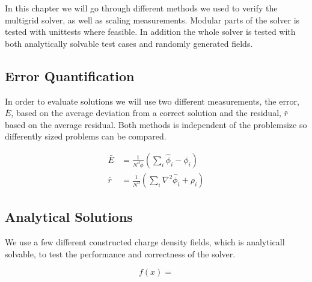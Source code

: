 In this chapter we will go through different methods we used to verify the multigrid
solver, as well as scaling measurements. Modular parts of the solver is tested with unittests
where feasible. In addition the whole solver is tested with both analytically solvable
test cases and randomly generated fields.

\subsection{Error Quantification}
	In order to evaluate solutions we will use two different measurements, the error, \(\bar{E}\), based
	on the average deviation from a correct solution and the residual, \(\bar{r}\) based on the average
	residual. Both methods is independent of the problemsize so differently sized problems can be compared.

	\begin{align}
		\bar{E} &= \frac{1}{N^d\bar{\phi}}\left( \sum_i{\hat{\phi}_i - \phi_i} \right)
		\\
		\bar{r} &= \frac{1}{N^d}\left( \sum_i{ \nabla^2 \hat{\phi}_i + \rho_i  }  \right)
	\end{align}

	\subsection{Analytical Solutions}
		We use a few different constructed charge density fields, which is analyticall solvable,
		to test the performance and correctness of the solver.

			\begin{equation}
				f(x) =
			\end{equation}

%
%
%
%

